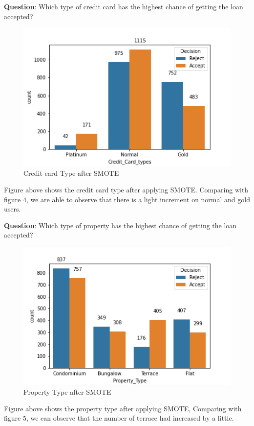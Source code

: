 \documentclass[11pt]{article}
\begin{document}
\noindent \textbf{Question}: Which type of credit card has the highest chance of getting the loan accepted?
\begin{figure}[h]
\centerline{\includegraphics[scale=0.8]{aSMOTE_ccard_type.png} }
\label{fig:aSmoteCredit}
\caption{Credit card Type after SMOTE}
\end{figure}

Figure above shows the credit card type after applying SMOTE. Comparing with figure 4, we are able to observe that there is a light increment on normal and gold users.
\clearpage

\noindent \textbf{Question}: Which type of property has the highest chance of getting the loan accepted?
\begin{figure}[h]
\centerline{\includegraphics[scale=0.8]{aSMOTE_property.png} }
\label{fig:aSmoteProperty}
\caption{Property Type after SMOTE}
\end{figure}

Figure above shows the property type after applying SMOTE, Comparing with figure 5, we can observe that the number of terrace had increased by a little.
\clearpage
\end{document}
